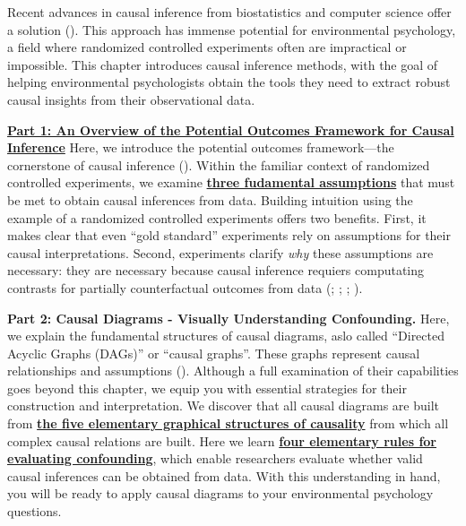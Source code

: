 \documentclass[
  singlecolumn]{article}
\begin{document}
Recent advances in causal inference from biostatistics and computer
science offer a solution (). This approach has immense potential for environmental
psychology, a field where randomized controlled experiments often are
impractical or impossible. This chapter introduces causal inference
methods, with the goal of helping environmental psychologists obtain the
tools they need to extract robust causal insights from their
observational data.

\hyperref[sec-part1]{\textbf{Part 1: An Overview of the Potential
Outcomes Framework for Causal Inference}} Here, we introduce the
potential outcomes framework---the cornerstone of causal inference
(). Within the familiar
context of randomized controlled experiments, we examine
\hyperref[sec-three-fundamental-assumptions]{\textbf{three fudamental
assumptions}} that must be met to obtain causal inferences from data.
Building intuition using the example of a randomized controlled
experiments offers two benefits. First, it makes clear that even ``gold
standard'' experiments rely on assumptions for their causal
interpretations. Second, experiments clarify \emph{why} these
assumptions are necessary: they are necessary because causal inference
requiers computating contrasts for partially counterfactual outcomes
from data (;
;
;
).

\textbf{Part 2: Causal Diagrams - Visually Understanding Confounding.}
Here, we explain the fundamental structures of causal diagrams, aslo
called ``Directed Acyclic Graphs (DAGs)'' or ``causal graphs''. These
graphs represent causal relationships and assumptions
(). Although a full examination of
their capabilities goes beyond this chapter, we equip you with essential
strategies for their construction and interpretation. We discover that
all causal diagrams are built from
\hyperref[sec-five-elementary]{\textbf{the five elementary graphical
structures of causality}} from which all complex causal relations are
built. Here we learn \hyperref[sec-four-rules]{\textbf{four elementary
rules for evaluating confounding}}, which enable researchers evaluate
whether valid causal inferences can be obtained from data. With this
understanding in hand, you will be ready to apply causal diagrams to
your environmental psychology questions.
\end{document}
